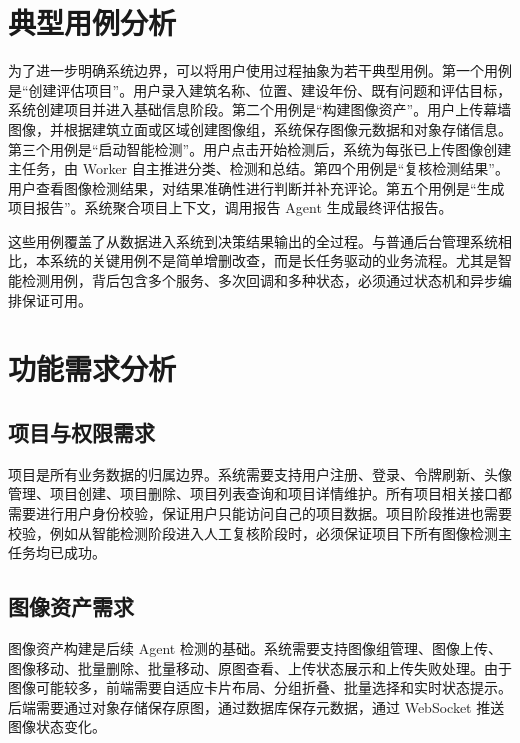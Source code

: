 \section{典型用例分析}
\label{sec:use-case-analysis}

为了进一步明确系统边界，可以将用户使用过程抽象为若干典型用例。第一个用例是“创建评估项目”。用户录入建筑名称、位置、建设年份、既有问题和评估目标，系统创建项目并进入基础信息阶段。第二个用例是“构建图像资产”。用户上传幕墙图像，并根据建筑立面或区域创建图像组，系统保存图像元数据和对象存储信息。第三个用例是“启动智能检测”。用户点击开始检测后，系统为每张已上传图像创建主任务，由 Worker 自主推进分类、检测和总结。第四个用例是“复核检测结果”。用户查看图像检测结果，对结果准确性进行判断并补充评论。第五个用例是“生成项目报告”。系统聚合项目上下文，调用报告 Agent 生成最终评估报告。

这些用例覆盖了从数据进入系统到决策结果输出的全过程。与普通后台管理系统相比，本系统的关键用例不是简单增删改查，而是长任务驱动的业务流程。尤其是智能检测用例，背后包含多个服务、多次回调和多种状态，必须通过状态机和异步编排保证可用。

\section{功能需求分析}
\label{sec:functional-analysis}

\subsection{项目与权限需求}
\label{subsec:project-permission}

项目是所有业务数据的归属边界。系统需要支持用户注册、登录、令牌刷新、头像管理、项目创建、项目删除、项目列表查询和项目详情维护。所有项目相关接口都需要进行用户身份校验，保证用户只能访问自己的项目数据。项目阶段推进也需要校验，例如从智能检测阶段进入人工复核阶段时，必须保证项目下所有图像检测主任务均已成功。

\subsection{图像资产需求}
\label{subsec:image-asset-requirement}

图像资产构建是后续 Agent 检测的基础。系统需要支持图像组管理、图像上传、图像移动、批量删除、批量移动、原图查看、上传状态展示和上传失败处理。由于图像可能较多，前端需要自适应卡片布局、分组折叠、批量选择和实时状态提示。后端需要通过对象存储保存原图，通过数据库保存元数据，通过 WebSocket 推送图像状态变化。

